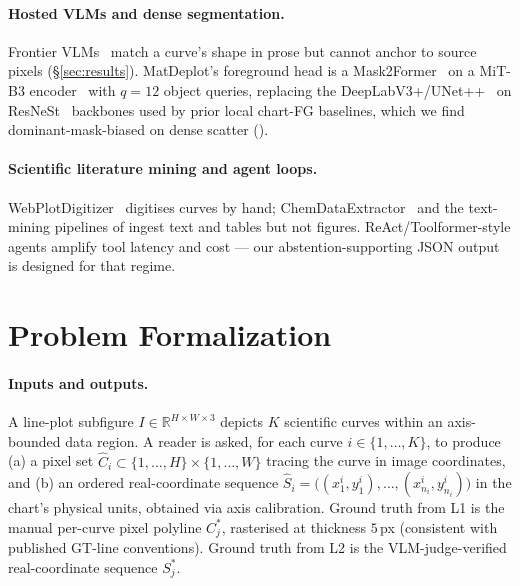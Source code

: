 \documentclass{article}
\begin{document}
\paragraph{Hosted VLMs and dense segmentation.}
Frontier VLMs~\citep{gpt4,claude,gemini,qwenvl} match a curve's
shape in prose but cannot anchor to source pixels
(\S\ref{sec:results}). MatDeplot's foreground head is a
Mask2Former~\citep{mask2former} on a MiT-B3 encoder~\citep{mitb3}
with $q{=}12$ object queries, replacing the
DeepLabV3+/UNet++~\citep{deeplabv3plus,unetplusplus} on
ResNeSt~\citep{resnest} backbones used by prior local chart-FG
baselines, which we find dominant-mask-biased on dense scatter
().

\paragraph{Scientific literature mining and agent loops.}
WebPlotDigitizer~\citep{webplotdigitizer} digitises curves by hand;
ChemDataExtractor~\citep{chemdataextractor} and the text-mining
pipelines of \citet{kononova2019,olivetti2020} ingest text and
tables but not figures. ReAct/Toolformer-style agents
\citep{react,toolformer} amplify tool latency and cost --- our
abstention-supporting JSON output is designed for that regime.

\section{Problem Formalization}
\label{sec:formal}

\paragraph{Inputs and outputs.}
A line-plot subfigure $I \in \mathbb{R}^{H \times W \times 3}$
depicts $K$ scientific curves within an axis-bounded data region.
A reader is asked, for each curve $i \in \{1,\ldots,K\}$, to produce
(a) a pixel set $\hat{C}_{i} \subset \{1,\ldots,H\}\times\{1,\ldots,W\}$
tracing the curve in image coordinates, and
(b) an ordered real-coordinate sequence
$\hat{S}_{i}=\bigl((x^{i}_{1},y^{i}_{1}),\ldots,(x^{i}_{n_i},y^{i}_{n_i})\bigr)$
in the chart's physical units, obtained via axis calibration.
Ground truth from L1 is the manual per-curve pixel polyline
$C^{*}_{j}$, rasterised at thickness $5$\,px (consistent with
published GT-line conventions). Ground truth from L2 is the
VLM-judge-verified real-coordinate sequence $S^{*}_{j}$.
\end{document}
